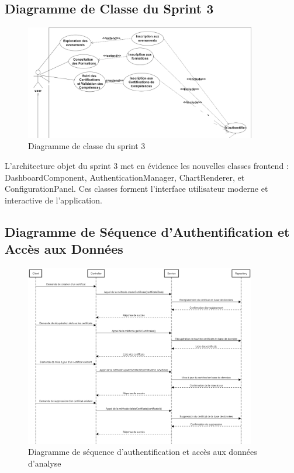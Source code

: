 \subsection{Diagramme de Classe du Sprint 3}

\begin{figure}[H]
\centering
\includegraphics[width=0.9\textwidth]{assets/images/sprint3-usecase.png}
\caption{Diagramme de classe du sprint 3}
\label{fig:sprint3-class}
\end{figure}

L'architecture objet du sprint 3 met en évidence les nouvelles classes frontend : DashboardComponent, AuthenticationManager, ChartRenderer, et ConfigurationPanel. Ces classes forment l'interface utilisateur moderne et interactive de l'application.

\subsection{Diagramme de Séquence d'Authentification et Accès aux Données}

\begin{figure}[H]
\centering
\includegraphics[width=0.9\textwidth]{assets/images/seq-certifs.png}
\caption{Diagramme de séquence d'authentification et accès aux données d'analyse}
\label{fig:sprint1-sequence}
\end{figure}

